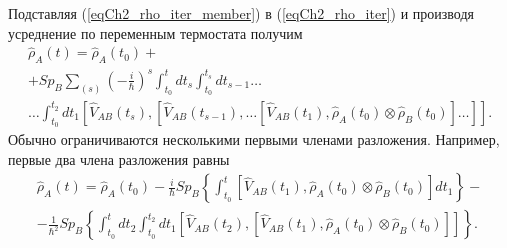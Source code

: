 Подставляя (\ref{eqCh2_rho_iter_member}) в (\ref{eqCh2_rho_iter}) и производя усреднение 
по переменным термостата получим
\begin{eqnarray}
\hat{\rho}_{A}\left(t\right) = 
\hat{\rho}_{A}\left(t_0\right) + 
\nonumber \\
+ Sp_{B} \sum_{\left(s\right)} \left(- \frac{i}{\hbar}\right)^{s}\int_{t_0}^{t} dt_{s} \int_{t_0}^{t_s} dt_{s-1} \dots
\nonumber \\
\dots \int_{t_0}^{t_{2}} dt_1 
\left[\hat{V}_{AB}\left(t_s\right), 
\left[\hat{V}_{AB}\left(t_{s - 1}\right),
\dotsc
\left[\hat{V}_{AB}\left(t_1\right),
\hat{\rho}_{A}\left(t_0\right)
\otimes
\hat{\rho}_{B}\left(t_0\right)
\right]
\dots
\right]
\right].
\label{eqCh2_rho_sequance}
\end{eqnarray}
Обычно ограничиваются несколькими первыми членами
разложения. Например, первые два члена разложения равны 
\begin{eqnarray}
\hat{\rho}_{A}\left(t\right) = 
\hat{\rho}_{A}\left(t_0\right) - \frac{i}{\hbar} Sp_B \left\{
\int_{t_0}^{t} 
\left[\hat{V}_{AB}\left(t_1\right), \hat{\rho}_{A}\left(t_0\right)
\otimes
\hat{\rho}_{B}\left(t_0\right)
\right]d t_1
\right\} -
\nonumber \\
-
\frac{1}{\hbar^2}
Sp_B \left\{
\int_{t_0}^{t}d t_2 
\int_{t_0}^{t_2} d t_1
\left[\hat{V}_{AB}\left(t_2\right), 
\left[\hat{V}_{AB}\left(t_1\right), 
\hat{\rho}_{A}\left(t_0\right)
\otimes
\hat{\rho}_{B}\left(t_0\right)
\right]
\right]
\right\}.
\nonumber
\end{eqnarray}
